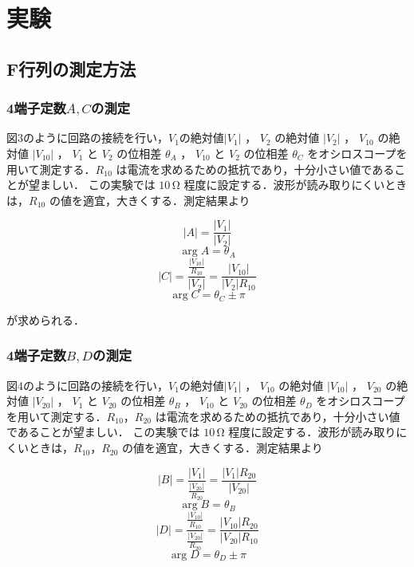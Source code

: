 
\section{実験}
\subsection{F行列の測定方法}
\subsubsection{4端子定数$A,C$の測定}
図3のように回路の接続を行い，$V_1$の絶対値$\left|V_1\right|$ ， $V_2$ の絶対値 $\left|V_2\right|$ ， $V_{10}$ の絶対値 $\left|V_{10}\right|$ ， $V_1$ と $V_2$ の位相差 $\theta_A$ ， $V_{10}$ と $V_2$ の位相差 $\theta_C$
をオシロスコープを用いて測定する．$R_{10}$ は電流を求めるための抵抗であり，十分小さい値であることが望ましい．
この実験では $10\,\si{\ohm}$ 程度に設定する．波形が読み取りにくいときは，$R_{10}$ の値を適宜，大きくする．測定結果より

$$
|A|=\frac{\left|V_1\right|}{\left|V_2\right|}
$$
$$
\arg A=\theta_A
$$
$$
|C|=\frac{\frac{\left|V_{10}\right|}{R_{10}}}{\left|V_2\right|}=\frac{\left|V_{10}\right|}{\left|V_2\right| R_{10}}
$$
$$
\arg C=\theta_C \pm \pi
$$

が求められる．
\subsubsection{4端子定数$B,D$の測定}
図4のように回路の接続を行い，$V_1$の絶対値$\left|V_1\right|$ ， $V_{10}$ の絶対値 $\left|V_{10}\right|$ ， $V_{20}$ の絶対値 $\left|V_{20}\right|$ ， $V_1$ と $V_{20}$ の位相差 $\theta_B$ ， $V_{10}$ と $V_{20}$ の位相差 $\theta_D$
をオシロスコープを用いて測定する．$R_{10}$，$R_{20}$ は電流を求めるための抵抗であり，十分小さい値であることが望ましい．
この実験では $10\,\si{\ohm}$ 程度に設定する．波形が読み取りにくいときは，$R_{10}$，$R_{20}$ の値を適宜，大きくする．測定結果より

$$
|B|=\frac{\left|V_1\right|}{\frac{\left|V_{20}\right|}{R_{20}}}=\frac{\left|V_1\right| R_{20}}{\left|V_{20}\right|}
$$
$$
\arg B=\theta_B
$$
$$
|D|=\frac{\frac{\left|V_{10}\right|}{R_{10}}}{\frac{\left|V_{20}\right|}{R_{20}}}=\frac{\left|V_{10}\right| R_{20}}{\left|V_{20}\right| R_{10}}
$$
$$
\arg D=\theta_D \pm \pi
$$



